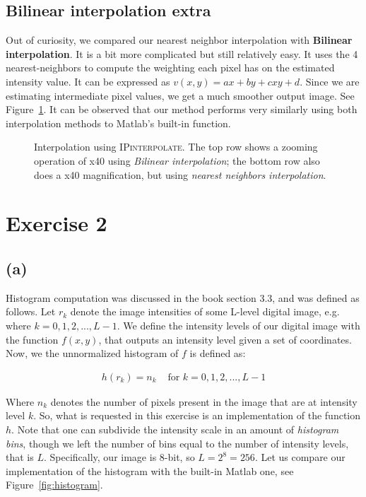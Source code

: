 \documentclass{article}
\begin{document}
\subsection*{Bilinear interpolation extra}
Out of curiosity, we compared our nearest neighbor interpolation with \textbf{Bilinear interpolation}. It is a bit more complicated but still relatively easy. It uses the 4 nearest-neighbors to compute the weighting each pixel has on the estimated intensity value. It can be expressed as $v(x, y) = ax + by + cxy + d$. Since we are estimating intermediate pixel values, we get a much smoother output image. See Figure~\ref{fig:bilinear}. It can be observed that our method performs very similarly using both interpolation methods to Matlab's built-in function.

\begin{figure}[ht]
    \centering
    
    
    \caption{Interpolation using \textsc{IPinterpolate}. The top row shows a zooming operation of x40 using \textit{Bilinear interpolation}; the bottom row also does a x40 magnification, but using \textit{nearest neighbors interpolation}.}
    \label{fig:bilinear}
\end{figure}

\section*{Exercise 2}
\subsection*{(a)} Histogram computation was discussed in the book section 3.3, and was defined as follows. Let $r_k$ denote the image intensities of some L-level digital image, e.g. where $k = 0,1,2,...,L-1$. We define the intensity levels of our digital image with the function $f(x, y)$, that outputs an intensity level given a set of coordinates. Now, we the unnormalized histogram of $f$ is defined as:

\[
\begin{aligned}
h(r_k)=n_k & \text{ for $k=0,1,2,...,L-1$}
\end{aligned}
\]

Where $n_k$ denotes the number of pixels present in the image that are at intensity level $k$. So, what is requested in this exercise is an implementation of the function $h$. Note that one can subdivide the intensity scale in an amount of \textit{histogram bins}, though we left the number of bins equal to the number of intensity levels, that is $L$. Specifically, our image is 8-bit, so $L = 2^8 = 256$. Let us compare our implementation of the histogram with the built-in Matlab one, see Figure~\ref{fig:histogram}.
\end{document}
